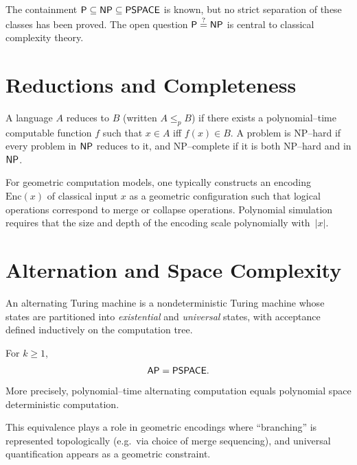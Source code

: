 \begin{remark}
The containment ${\sf P} \subseteq {\sf NP} \subseteq {\sf PSPACE}$ is known,
but no strict separation of these classes has been proved.
The open question ${\sf P} \stackrel{?}{=} {\sf NP}$ is central to classical
complexity theory.
\end{remark}

\section{Reductions and Completeness}

\begin{definition}
A language $A$ reduces to $B$ (written $A \le_p B$) if there exists a
polynomial--time computable function $f$ such that
$x \in A$ iff $f(x)\in B$.  A problem is {\sf NP--hard} if every problem in
${\sf NP}$ reduces to it, and {\sf NP--complete} if it is both
{\sf NP--hard} and in ${\sf NP}$.
\end{definition}

\begin{remark}
For geometric computation models, one typically constructs an encoding
$\mathrm{Enc}(x)$ of classical input $x$ as a geometric configuration such that
logical operations correspond to merge or collapse operations.
Polynomial simulation requires that the size and depth of the encoding scale
polynomially with~$|x|$.
\end{remark}

\section{Alternation and Space Complexity}

\begin{definition}
An alternating Turing machine is a nondeterministic Turing machine whose
states are partitioned into \emph{existential} and \emph{universal} states,
with acceptance defined inductively on the computation tree.
\end{definition}

\begin{theorem}
For $k\ge 1$,
\[
{\sf AP} = {\sf PSPACE}.
\]
More precisely, polynomial--time alternating computation equals polynomial
space deterministic computation.
\end{theorem}

\begin{remark}
This equivalence plays a role in geometric encodings where
``branching'' is represented topologically (e.g.~via choice of merge
sequencing), and universal quantification appears as a geometric constraint.
\end{remark}

